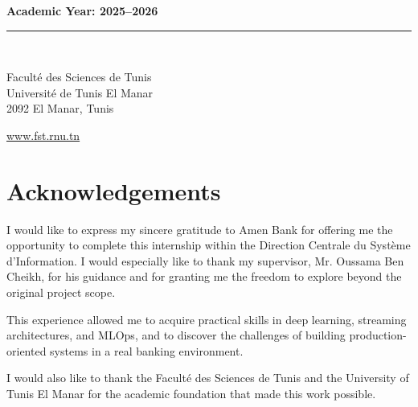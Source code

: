 \documentclass[11pt,a4paper,oneside]{report}
\begin{document}
\begin{titlepage}
\begin{center}
        {\large \textbf{Academic Year: 2025--2026}}
        
        \vfill
        
        \rule{\textwidth}{1pt}\\[0.2cm]
        \begin{minipage}{0.45\textwidth}
            \small
            Faculté des Sciences de Tunis\\
            Université de Tunis El Manar\\
            2092 El Manar, Tunis
        \end{minipage}
        \hfill
        \begin{minipage}{0.45\textwidth}
            \raggedleft\small
            \url{www.fst.rnu.tn}
        \end{minipage}
        
    \end{center}
\end{titlepage}


\chapter*{Acknowledgements}

I would like to express my sincere gratitude to Amen Bank for offering me the opportunity to complete this internship within the Direction Centrale du Syst\`eme d'Information. I would especially like to thank my supervisor, Mr. Oussama Ben Cheikh, for his guidance and for granting me the freedom to explore beyond the original project scope.

This experience allowed me to acquire practical skills in deep learning, streaming architectures, and MLOps, and to discover the challenges of building production-oriented systems in a real banking environment.

I would also like to thank the Facult\'e des Sciences de Tunis and the University of Tunis El Manar for the academic foundation that made this work possible.

\tableofcontents
\listoffigures
\listoftables
\end{document}
